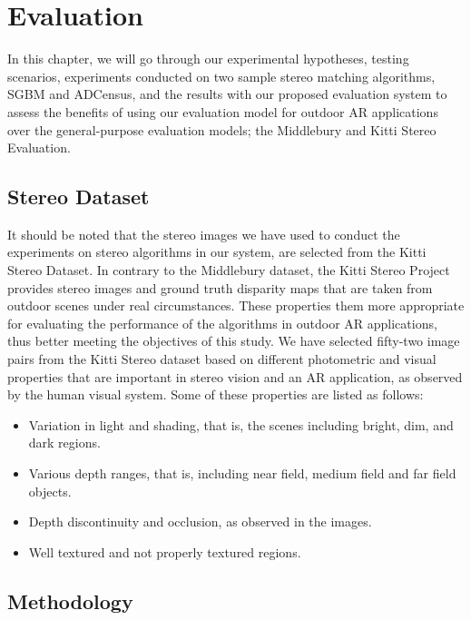 \chapter{Evaluation}
\label{chap:Evaluation}
\renewcommand{\arraystretch}{0.5}

In this chapter, we will go through our experimental hypotheses, testing scenarios, experiments conducted on two sample 
stereo matching algorithms, SGBM and ADCensus, and the results with our
proposed evaluation system to assess the benefits of using our evaluation model for outdoor AR applications over the general-purpose evaluation models; 
the Middlebury and Kitti Stereo Evaluation.

\section{Stereo Dataset}
It should be noted that the stereo images we have used to conduct the experiments on stereo algorithms in our system,
are selected from the Kitti Stereo Dataset.
In contrary to the Middlebury dataset, the Kitti Stereo Project provides stereo images and ground truth disparity maps
that are taken from outdoor scenes under real circumstances. These properties them more appropriate 
for evaluating the performance of the algorithms in outdoor AR applications, thus better meeting the objectives of this study.
We have selected fifty-two image pairs from the Kitti Stereo dataset based on different photometric and visual properties that are important
in stereo vision and an AR application, as observed by the human visual system. Some 
of these properties are listed as follows:
\begin{itemize}
\item Variation in light and shading, that is, the scenes including bright, dim, and dark regions.
\item Various depth ranges, that is, including near field, medium field and far field objects. 
\item Depth discontinuity and occlusion, as observed in the images.
\item Well textured and not properly textured regions.
\end{itemize}

\section{Methodology}

